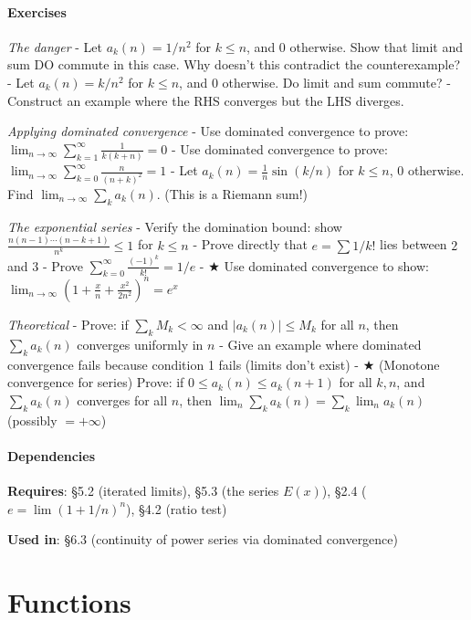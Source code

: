 \documentclass[
  10pt,
  letterpaper,
]{scrbook}
\begin{document}
\subsection{Exercises}\label{exercises-23}

\emph{The danger} - Let \(a_k(n) = 1/n^2\) for \(k \leq n\), and \(0\)
otherwise. Show that limit and sum DO commute in this case. Why doesn't
this contradict the counterexample? - Let \(a_k(n) = k/n^2\) for
\(k \leq n\), and \(0\) otherwise. Do limit and sum commute? - Construct
an example where the RHS converges but the LHS diverges.

\emph{Applying dominated convergence} - Use dominated convergence to
prove: \(\lim_{n \to \infty} \sum_{k=1}^{\infty} \frac{1}{k(k+n)} = 0\)
- Use dominated convergence to prove:
\(\lim_{n \to \infty} \sum_{k=0}^{\infty} \frac{n}{(n+k)^2} = 1\) - Let
\(a_k(n) = \frac{1}{n} \sin(k/n)\) for \(k \leq n\), \(0\) otherwise.
Find \(\lim_{n \to \infty} \sum_k a_k(n)\). (This is a Riemann sum!)

\emph{The exponential series} - Verify the domination bound: show
\(\frac{n(n-1)\cdots(n-k+1)}{n^k} \leq 1\) for \(k \leq n\) - Prove
directly that \(e = \sum 1/k!\) lies between \(2\) and \(3\) - Prove
\(\sum_{k=0}^{\infty} \frac{(-1)^k}{k!} = 1/e\) - ★ Use dominated
convergence to show:
\(\lim_{n \to \infty} \left(1 + \frac{x}{n} + \frac{x^2}{2n^2}\right)^n = e^x\)

\emph{Theoretical} - Prove: if \(\sum_k M_k < \infty\) and
\(|a_k(n)| \leq M_k\) for all \(n\), then \(\sum_k a_k(n)\) converges
uniformly in \(n\) - Give an example where dominated convergence fails
because condition 1 fails (limits don't exist) - ★ (Monotone convergence
for series) Prove: if \(0 \leq a_k(n) \leq a_k(n+1)\) for all \(k, n\),
and \(\sum_k a_k(n)\) converges for all \(n\), then
\(\lim_n \sum_k a_k(n) = \sum_k \lim_n a_k(n)\) (possibly \(= +\infty\))

\subsection{Dependencies}\label{dependencies-23}

\textbf{Requires}: §5.2 (iterated limits), §5.3 (the series \(E(x)\)),
§2.4 (\(e = \lim(1+1/n)^n\)), §4.2 (ratio test)

\textbf{Used in}: §6.3 (continuity of power series via dominated
convergence)

\part{Functions}
\end{document}
